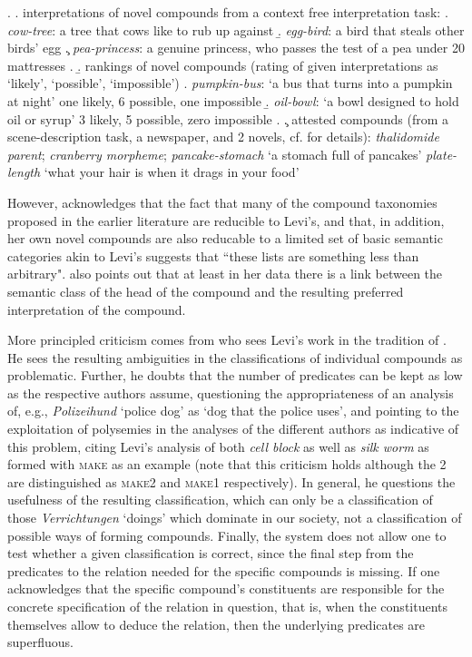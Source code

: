 \ex. \label{Downing_1977_14}
\a. interpretations of novel compounds from a context free
interpretation task:
\a. \emph{cow-tree}: a tree that cows like to rub up against
\b. \emph{egg-bird}: a bird that steals other birds' egg
\c. \emph{pea-princess}: a genuine princess, who passes the test of a
pea under 20 mattresses
\z. 
\b. rankings of novel compounds (rating of given interpretations as
\\`likely', `possible', `impossible')
\a. \emph{pumpkin-bus}: `a bus that turns into a pumpkin at night' one
likely, 6 possible, one impossible
\b. \emph{oil-bowl}: `a bowl designed to hold oil or syrup' 3 likely,
5 possible, zero impossible
\z.
\c. attested compounds (from a scene-description task, a
newspaper, and 2 novels, cf. \citealt[817]{Downing:1977} for
details): \emph{thalidomide parent}; \emph{cranberry morpheme};
\emph{pancake-stomach} `a stomach full of pancakes' \emph{plate-length}
`what your hair is when it drags in your food'

However, \citet[828]{Downing:1977} acknowledges that the fact that
many of the compound taxonomies proposed in the earlier literature are
reducible to Levi's, and that, in addition, her own novel compounds
are also reducable to a limited set of basic semantic categories akin
to Levi's suggests that ``these lists are something less than
arbitrary". \citet[828--829]{Downing:1977} also points out that at
least in her data there is a link between the semantic class of the
head of the compound and the resulting preferred interpretation of the
compound.

More principled criticism comes from \citet[151--154]{Fanselow:1981}
who sees Levi's work in the tradition of \citet{Motsch:1970}. He sees
the resulting ambiguities in the classifications of individual
compounds as problematic. Further, he doubts that the number of predicates
can be kept as low as the respective authors assume, questioning the
appropriateness of an analysis of, e.g., \emph{Polizeihund} `police dog'
as `dog that the police uses', and pointing to the exploitation of
polysemies in the analyses of the different authors as indicative of
this problem, citing Levi's analysis of both \emph{cell block} as well
as \emph{silk worm} as formed with \textsc{make} as an example (note
that this criticism holds although the 2 are distinguished as
\textsc{make2} and \textsc{make1} respectively). In general, he
questions the usefulness of the resulting classification, which can
only be a classification of those \emph{Verrichtungen} `doings' which
dominate in our society, not a classification of possible ways of
forming compounds. Finally, the system does not allow one to test whether a
given classification is correct, since the final step from the
predicates to the relation needed for the specific compounds is
missing. If one acknowledges that the specific compound's constituents
are responsible for the concrete specification of the relation in
question, that is, when the constituents themselves allow to deduce
the relation, then the underlying predicates are superfluous.

